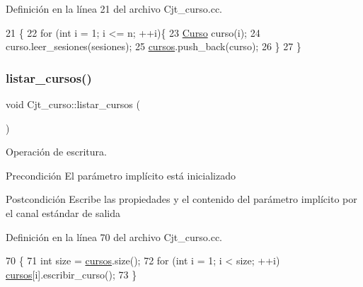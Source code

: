 Definición en la línea 21 del archivo Cjt\+\_\+curso.\+cc.


\begin{DoxyCode}
21                                                        \{
22   \textcolor{keywordflow}{for} (\textcolor{keywordtype}{int} i = 1; i <= n; ++i)\{
23    \mbox{\hyperlink{class_curso}{Curso}} curso(i);
24    curso.leer\_sesiones(sesiones);
25    \mbox{\hyperlink{class_cjt__curso_af8d4def315cf56b9aab3328bf80bb32c}{cursos}}.push\_back(curso);
26  \}
27 \}
\end{DoxyCode}
\mbox{\label{class_cjt__curso_a2a1a2f9d0f54afaf5239b661f0d74164}} 
\subsubsection{\texorpdfstring{listar\+\_\+cursos()}{listar\_cursos()}}
{\footnotesize\ttfamily void Cjt\+\_\+curso\+::listar\+\_\+cursos (\begin{DoxyParamCaption}{ }\end{DoxyParamCaption})}



Operación de escritura. 

\begin{DoxyPrecond}{Precondición}
El parámetro implícito está inicializado 
\end{DoxyPrecond}
\begin{DoxyPostcond}{Postcondición}
Escribe las propiedades y el contenido del parámetro implícito por el canal estándar de salida 
\end{DoxyPostcond}


Definición en la línea 70 del archivo Cjt\+\_\+curso.\+cc.


\begin{DoxyCode}
70                               \{
71   \textcolor{keywordtype}{int} size = \mbox{\hyperlink{class_cjt__curso_af8d4def315cf56b9aab3328bf80bb32c}{cursos}}.size();
72   \textcolor{keywordflow}{for} (\textcolor{keywordtype}{int} i = 1; i < size; ++i) \mbox{\hyperlink{class_cjt__curso_af8d4def315cf56b9aab3328bf80bb32c}{cursos}}[i].escribir\_curso();
73 \}
\end{DoxyCode}
\mbox{\label{class_cjt__curso_a8757e2e3a01006da2a553e9fbf119fd9}} 
